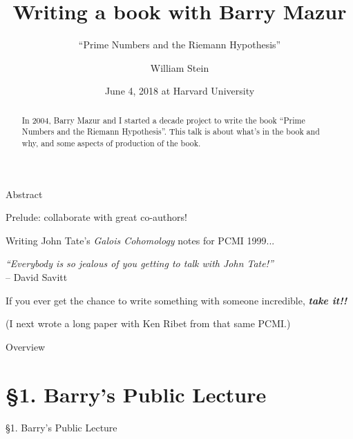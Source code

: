 \documentclass{beamer}
\title{Writing a book with Barry Mazur}
\subtitle{``Prime Numbers and the Riemann Hypothesis''}
\author[W.\thinspace{}Stein]{William Stein}
\date[Mazur 80]{June 4, 2018 at Harvard University}
\institute[SageMath, Inc. \& UW]{SageMath, Inc. and University of Washington}
\newcommand{\mysection}[2]{\section{\S#1. #2}%
\begin{frame}{}
\vfill
\begin{center}
\hrulefill
\vfill
\Huge\sc \S#1. #2
\vfill
\hrulefill
\end{center}
\vfill
\end{frame}}
\begin{document}
\begin{frame}
  \titlepage
\end{frame}

\begin{frame}{Abstract}
  \begin{abstract}
    In 2004, Barry Mazur and I started a decade project to write the
    book ``Prime Numbers and the Riemann Hypothesis''.
    This talk is about
    what's in the book and why, and some aspects
    of production of the book.
  \end{abstract}
\end{frame}

\begin{frame}{Prelude: collaborate with great co-authors!}

  Writing John Tate's {\em Galois Cohomology} notes for PCMI 1999...

  \vfill

  \begin{block}{}
    {\em
      ``Everybody is so jealous of you getting
      to talk with John Tate!''}\\
    -- David Savitt
  \end{block}

  \vfill

  If you ever get the chance
  to write something with someone incredible,
  {\bf\em take it!!}

  \vfill

  (I next wrote a long paper with Ken Ribet from that same PCMI.)

\end{frame}


\begin{frame}{Overview}
  \tableofcontents
\end{frame}

\mysection{1}{Barry's Public Lecture}
\end{document}
